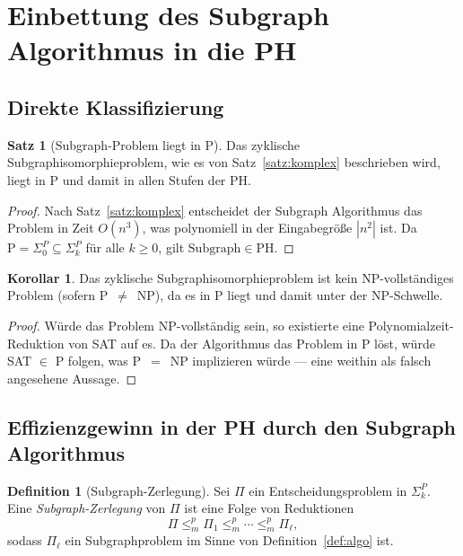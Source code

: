 ﻿\documentclass[a4paper,12pt]{article}
\theoremstyle{definition}
\newtheorem{definition}{Definition}
\newtheorem{satz}{Satz}
\newtheorem{korollar}{Korollar}
\begin{document}
\section{Einbettung des Subgraph Algorithmus in die PH}
\label{sec:einbettung}

\subsection{Direkte Klassifizierung}

\begin{satz}[Subgraph-Problem liegt in P]
\label{satz:in_p}
  Das zyklische Subgraphisomorphieproblem, wie es von Satz~\ref{satz:komplex}
  beschrieben wird, liegt in \textup{P} und damit in allen Stufen der PH.
\end{satz}

\begin{proof}
  Nach Satz~\ref{satz:komplex} entscheidet der Subgraph Algorithmus das Problem
  in Zeit $O(n^3)$, was polynomiell in der Eingabegröße $|n^2|$ ist.
  Da $\mathrm{P} = \Sigma_0^P \subseteq \Sigma_k^P$ für alle $k \geq 0$,
  gilt $\mathrm{Subgraph} \in \mathrm{PH}$.
\end{proof}

\begin{korollar}
  Das zyklische Subgraphisomorphieproblem ist kein NP-vollständiges Problem
  (sofern P~$\neq$~NP), da es in P liegt und damit unter der NP-Schwelle.
\end{korollar}

\begin{proof}
  Würde das Problem NP-vollständig sein, so existierte eine Polynomialzeit-Reduktion
  von SAT auf es. Da der Algorithmus das Problem in P löst, würde SAT $\in$ P folgen,
  was P~$=$~NP implizieren würde --- eine weithin als falsch angesehene Aussage.
\end{proof}

\subsection{Effizienzgewinn in der PH durch den Subgraph Algorithmus}

\begin{definition}[Subgraph-Zerlegung]
  Sei $\Pi$ ein Entscheidungsproblem in $\Sigma_k^P$.
  Eine \emph{Subgraph-Zerlegung} von $\Pi$ ist eine Folge von Reduktionen
  \[
    \Pi \leq_m^p \Pi_1 \leq_m^p \cdots \leq_m^p \Pi_\ell,
  \]
  sodass $\Pi_\ell$ ein Subgraphproblem im Sinne von Definition~\ref{def:algo} ist.
\end{definition}
\end{document}
